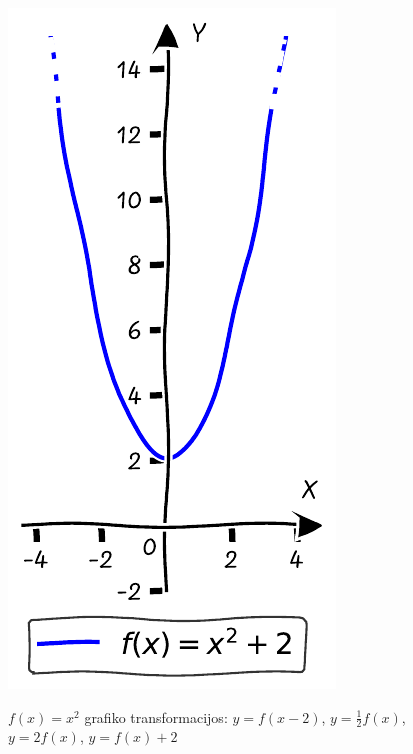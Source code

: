 \documentclass{tufte-handout}
\begin{document}
\begin{figure}[h]
\begin{minipage}{0.19\textwidth}
    \label{fig:third}
  \end{minipage}\hfill
  \begin{minipage}{0.19\textwidth}
    \includegraphics[width=\linewidth]{./graphs/quadratic_func_ush_2.pdf}
    \label{fig:fourth}
  \end{minipage}
  \caption{$f(x)=x^2$ grafiko transformacijos: $y=f(x-2)$, $y=\frac{1}{2}f(x)$,
    $y=2f(x)$, $y=f(x)+2$ }
\end{figure}
\end{document}
